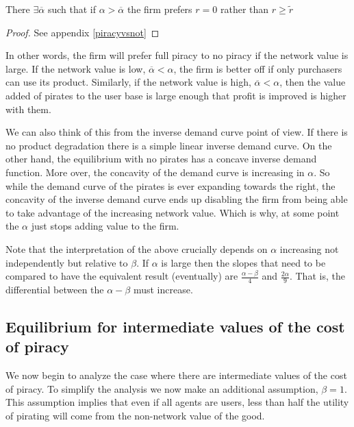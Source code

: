 \begin{proposition}\label{piracyvsnotproposition}
There $ \exists \overline{\alpha} $ such that if $\alpha > \overline{\alpha}$ the firm prefers $r=0$ rather than $r \geq \tilde{r}$
\end{proposition}

\begin{proof}
See appendix \ref{piracyvsnot}
\end{proof}

In other words, the firm will prefer full piracy to no piracy if the network value is large. If the network value is low, $\overline{\alpha}<\alpha$, the firm is better off if only purchasers can use its product. Similarly, if the network value is high, $\overline{\alpha}<\alpha$, then the value added of pirates to the user base is large enough that profit is improved is higher with them. 

We can also think of this from the inverse demand curve point of view. If there is no product degradation there is a simple linear inverse demand curve. On the other hand, the equilibrium with no pirates has a concave inverse demand function. More over, the concavity of the demand curve is increasing in $\alpha$. So while the demand curve of the pirates is ever expanding towards the right, the concavity of the inverse demand curve ends up disabling the firm from being able to take advantage of the increasing network value. Which is why, at some point the $\alpha$ just stops adding value to the firm.

Note that the interpretation of the above crucially depends on $\alpha$ increasing not independently but relative to $\beta$. If $\alpha$ is large then the slopes that need to be compared to have the equivalent result (eventually) are $\frac{\alpha - \beta}{4}$ and $\frac{2 \alpha}{9}$. That is, the differential between the $\alpha-\beta$ must increase. 


\subsection{ Equilibrium for intermediate values of the cost of piracy}


We now begin to analyze the case where there are intermediate values of the cost of piracy. To simplify the analysis we now make an additional assumption, $\beta=1$. This assumption implies that even if all agents are users, less than half the utility of pirating will come from the non-network value of the good. 

